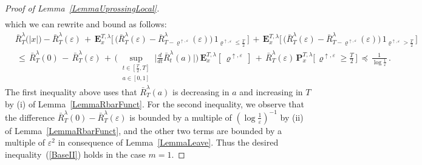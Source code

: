 \documentclass[10pt]{article}
\numberwithin{equation}{section}
\theoremstyle{definition}
\begin{document}
\begin{proof}[Proof of Lemma~\ref{LemmaUprossingLocal}]
\begin{align}
 \end{align}
which we can rewrite and bound as follows:
\begin{align*}
&\bar{R}_{T}^{\lambda}\big(|x|\big)-\bar{R}_{T}^{\lambda}(\varepsilon) \,+\,\mathbf{E}^{T,\lambda}_{x}\Big[\,\Big(\bar{R}_{T}^{\lambda}(\varepsilon)- \bar{R}_{T-\varrho^{\uparrow, \varepsilon}}^{\lambda}(\varepsilon)\Big)\,1_{ \varrho^{\uparrow, \varepsilon}\leq \frac{T}{2} 
 }\,\Big]\,+\,\mathbf{E}^{T,\lambda}_{x}\Big[\,\Big(\bar{R}_{T}^{\lambda}(\varepsilon)- \bar{R}_{T-\varrho^{\uparrow, \varepsilon}}^{\lambda}(\varepsilon)\Big)\,1_{ \varrho^{\uparrow, \varepsilon} > \frac{T}{2} 
 }\,\Big]\\ &\,\leq \,\bar{R}_{T}^{\lambda}(0)\,-\,\bar{R}_{T}^{\lambda}(\varepsilon) \,+\,\Bigg(\sup_{\substack{t\in [\frac{T}{2},T] \\ a\in [0,1] } }\Big|\frac{d}{dt}\bar{R}_{t}^{\lambda}(a)\Big| \Bigg)\,\mathbf{E}^{T,\lambda}_{x}[\, \varrho^{\uparrow, \varepsilon} \,]\,+\,  \bar{R}_{T}^{\lambda}(\varepsilon) \,\mathbf{P}^{T,\lambda}_{x}\Big[\,\varrho^{\uparrow, \varepsilon}\geq \frac{T}{2} \,\Big] \,\preceq \, \frac{  1}{\log \frac{1}{\varepsilon} }  \,.
\end{align*}
The first inequality above uses that  $\bar{R}_{T}^{\lambda}(a)$ is decreasing in $a$ and increasing in $T$ by (i) of Lemma~\ref{LemmaRbarFunct}. For the second inequality, we observe that the difference $\bar{R}_{T}^{\lambda}(0)-\bar{R}_{T}^{\lambda}(\varepsilon)$ is  bounded by a multiple of $(\log \frac{1}{\varepsilon})^{-1}$ by (ii) of Lemma~\ref{LemmaRbarFunct}, and the other two terms are bounded by a multiple of $\varepsilon^2$ in consequence of  Lemma~\ref{LemmaLeave}.  Thus the desired inequality~(\ref{BaseII}) holds in the case $m=1$.



\end{proof}
\end{document}
